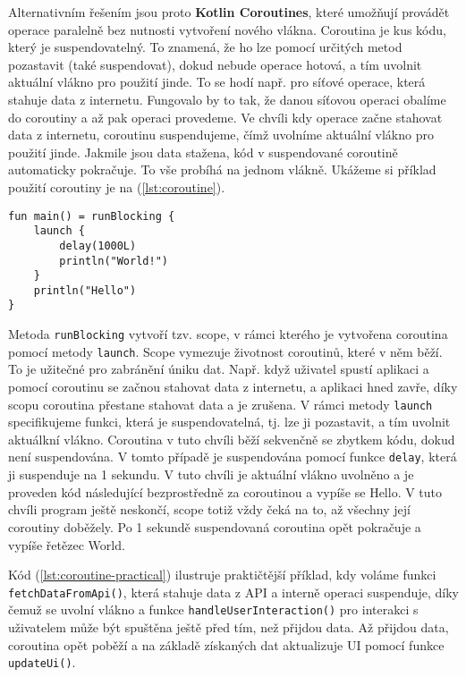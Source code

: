 Alternativním řešením jsou proto \textbf{Kotlin Coroutines}, které umožňují provádět operace paralelně bez nutnosti vytvoření nového vlákna. Coroutina je kus kódu, který je suspendovatelný. To znamená, že ho lze pomocí určitých metod pozastavit (také suspendovat), dokud nebude operace hotová, a tím uvolnit aktuální vlákno pro použití jinde. To se hodí např. pro síťové operace, která stahuje data z internetu. Fungovalo by to tak, že danou síťovou operaci obalíme do coroutiny a až pak operaci provedeme. Ve chvíli kdy operace začne stahovat data z internetu, coroutinu suspendujeme, čímž uvolníme aktuální vlákno pro použití jinde. Jakmile jsou data stažena, kód v suspendované coroutině automaticky pokračuje. To vše probíhá na jednom vlákně. Ukážeme si příklad použití coroutiny je na (\ref{lst:coroutine}).

\begin{lstlisting}[caption={Příklad použití coroutiny}, label={lst:coroutine}, tabsize=2]
fun main() = runBlocking {
	launch {
		delay(1000L)
		println("World!")
	}
	println("Hello")
}
\end{lstlisting}

\noindent Metoda \lstinline|runBlocking| vytvoří tzv. scope, v rámci kterého je vytvořena coroutina pomocí metody \lstinline|launch|. Scope vymezuje životnost coroutinů, které v něm běží. To je užitečné pro zabránění úniku dat. Např. když uživatel spustí aplikaci a pomocí coroutinu se začnou stahovat data z internetu, a aplikaci hned zavře, díky scopu coroutina přestane stahovat data a je zrušena. V rámci metody \lstinline|launch| specifikujeme funkci, která je suspendovatelná, tj. lze ji pozastavit, a tím uvolnit aktuálkní vlákno. Coroutina v tuto chvíli běží sekvenčně se zbytkem kódu, dokud není suspendována. V tomto případě je suspendována pomocí funkce \lstinline|delay|, která ji suspenduje na 1 sekundu. V tuto chvíli je aktuální vlákno uvolněno a je proveden kód následující bezprostředně za coroutinou a vypíše se Hello. V tuto chvíli program ještě neskončí, scope totiž vždy čeká na to, až všechny její coroutiny doběžely. Po 1 sekundě suspendovaná coroutina opět pokračuje a vypíše řetězec World.

Kód (\ref{lst:coroutine-practical}) ilustruje praktičtější příklad, kdy voláme funkci \lstinline|fetchDataFromApi()|, která stahuje data z API a interně operaci suspenduje, díky čemuž se uvolní vlákno a funkce \lstinline|handleUserInteraction()| pro interakci s uživatelem může být spuštěna ještě před tím, než přijdou data. Až přijdou data, coroutina opět poběží a na základě získaných dat aktualizuje UI pomocí funkce \lstinline|updateUi()|.

